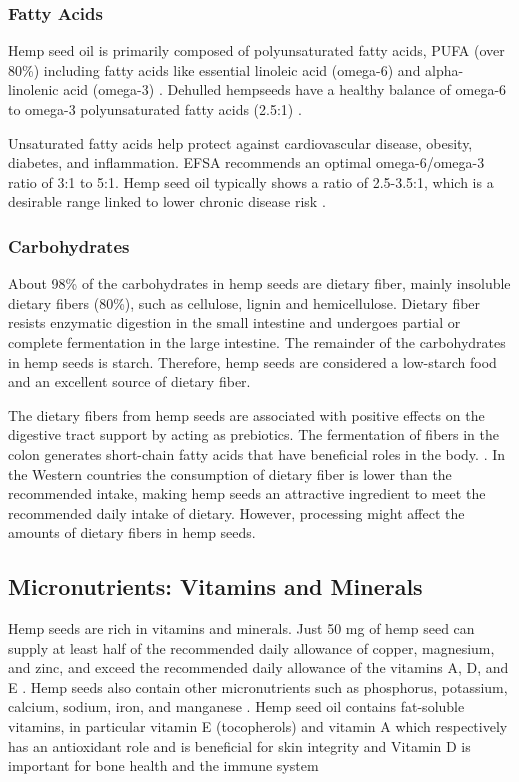 \subsubsection{Fatty Acids}
Hemp seed oil is primarily composed of polyunsaturated fatty acids, PUFA (over 80\%) including fatty acids like essential linoleic acid (omega-6) and alpha-linolenic acid (omega-3) \cite*{HempBook}. Dehulled hempseeds have a healthy balance of omega-6 to omega-3 polyunsaturated fatty acids (2.5:1) \cite*{HempBook}.

\vspace{1em}
Unsaturated fatty acids help protect against cardiovascular disease, obesity, diabetes, and inflammation. EFSA recommends an optimal omega-6/omega-3 ratio of 3:1 to 5:1. Hemp seed oil typically shows a ratio of 2.5-3.5:1, which is a desirable range linked to lower chronic disease risk \cite*{montero2023hemp}.

\subsubsection{Carbohydrates}
About 98\% of the carbohydrates in hemp seeds are dietary fiber, mainly insoluble dietary fibers (80\%), such as cellulose, lignin and hemicellulose. Dietary fiber resists enzymatic digestion in the small intestine and undergoes partial or complete fermentation in the large intestine. The remainder of the carbohydrates in hemp seeds is starch. Therefore, hemp seeds are considered a low-starch food and an excellent source of dietary fiber. \cite*{montero2023hemp} 

\vspace{1em}
The dietary fibers from hemp seeds are associated with positive effects on the digestive tract support by acting as prebiotics. The fermentation of fibers in the colon generates short-chain fatty acids that have beneficial roles in the body. \cite*{aluko2017hemp}. In the Western countries the consumption of dietary fiber is lower than the recommended intake, making hemp seeds an attractive ingredient to meet the recommended daily intake of dietary. However, processing might affect the amounts of dietary fibers in hemp seeds. 

\subsection{Micronutrients: Vitamins and Minerals}
Hemp seeds are rich in vitamins and minerals. Just 50 mg of hemp seed can supply at least half of the recommended daily allowance of copper, magnesium, and zinc, and exceed the recommended daily allowance of the vitamins A, D, and E \cite*{HempBook}. Hemp seeds also contain other micronutrients such as phosphorus, potassium, calcium, sodium, iron, and manganese \cite*{HempBook}. Hemp seed oil contains fat-soluble vitamins, in particular vitamin E (tocopherols) and vitamin A which respectively has an antioxidant role and is beneficial for skin integrity and Vitamin D is important for bone health and the immune system \cite*{montero2023hemp}

